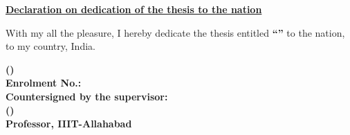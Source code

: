 
\begin{ThesisToNation}

\vspace{1cm}
\begin{center}
\Large \textbf{\underline{Declaration on dedication of the thesis to the nation}}
\end{center}


\vspace{1cm}
\noindent
With my all the pleasure, I hereby dedicate the thesis entitled \textbf{``\ttitle''} to the nation, to my country, India.

\vspace{2cm}

\flushleft
\textbf{(\authorname)}\\
\bfseries Enrolment No.: \enrollno\\
\vspace*{1em}
\large \bfseries Countersigned by the supervisor:\\
\vspace{2cm}
\normalsize
\textbf{(\supervisorname)}\\
\bfseries Professor, IIIT-Allahabad

\end{ThesisToNation}

